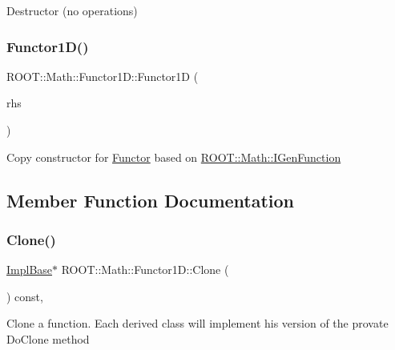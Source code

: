 Destructor (no operations) \mbox{\label{classROOT_1_1Math_1_1Functor1D_a3323053da6385e3168b80163b266c600}} 
\subsubsection{\texorpdfstring{Functor1D()}{Functor1D()}\hspace{0.1cm}{\footnotesize\ttfamily [12/12]}}
{\footnotesize\ttfamily R\+O\+O\+T\+::\+Math\+::\+Functor1\+D\+::\+Functor1D (\begin{DoxyParamCaption}\item[{const \mbox{\hyperlink{classROOT_1_1Math_1_1Functor1D}{Functor1D}} \&}]{rhs }\end{DoxyParamCaption})\hspace{0.3cm}{\ttfamily [inline]}}

Copy constructor for \mbox{\hyperlink{classROOT_1_1Math_1_1Functor}{Functor}} based on \mbox{\hyperlink{namespaceROOT_1_1Math_afe6400b4439b79d54c41fb9f5c5af171}{R\+O\+O\+T\+::\+Math\+::\+I\+Gen\+Function}} 

\subsection{Member Function Documentation}
\mbox{\label{classROOT_1_1Math_1_1Functor1D_af77ece084fc56e41c06e32e0f78a88a9}} 
\subsubsection{\texorpdfstring{Clone()}{Clone()}\hspace{0.1cm}{\footnotesize\ttfamily [1/3]}}
{\footnotesize\ttfamily \mbox{\hyperlink{classROOT_1_1Math_1_1Functor1D_a1ade2017edb7db0cbaf9a27a864f4dd3}{Impl\+Base}}$\ast$ R\+O\+O\+T\+::\+Math\+::\+Functor1\+D\+::\+Clone (\begin{DoxyParamCaption}{ }\end{DoxyParamCaption}) const\hspace{0.3cm}{\ttfamily [inline]}, {\ttfamily [virtual]}}

Clone a function. Each derived class will implement his version of the provate Do\+Clone method 

